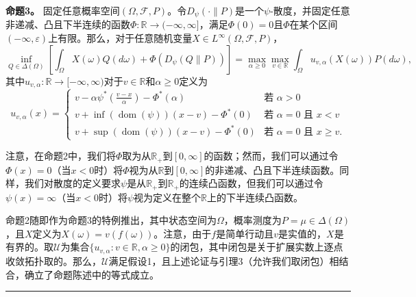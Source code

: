 \documentclass[12pt,a4paper]{article}
\newenvironment{translation}
  {\par\noindent\color{blue!70!black}\smallskip}
  {\par\medskip\hrule\medskip}
\begin{document}
\begin{translation}
\textbf{命题3。} 固定任意概率空间$(\Omega, \mathcal{F}, P)$。令$D_\psi(\cdot\|P)$是一个$\psi$-散度，并固定任意非递减、凸且下半连续的函数$\Phi: \mathbb{R} \to (-\infty, \infty]$，满足$\Phi(0) = 0$且$\Phi$在某个区间$(-\infty, \varepsilon)$上有限。那么，对于任意随机变量$X \in L^\infty(\Omega, \mathcal{F}, P)$，
\[
\inf_{Q \in \Delta(\Omega)} \left[ \int_\Omega X(\omega) Q(d\omega) + \Phi(D_\psi(Q\|P)) \right] = \max_{\alpha \geq 0} \max_{v \in \mathbb{R}} \int_\Omega u_{v,\alpha}(X(\omega)) P(d\omega),
\]
其中$u_{v,\alpha}: \mathbb{R} \to [-\infty, \infty)$对于$v \in \mathbb{R}$和$\alpha \geq 0$定义为
\[
u_{v,\alpha}(x) = \begin{cases}
v - \alpha \psi^*\left( \frac{v - x}{\alpha} \right) - \Phi^*(\alpha) & \text{若 } \alpha > 0 \\
v + \inf(\operatorname{dom}(\psi)) (x - v) - \Phi^*(0) & \text{若 } \alpha = 0 \text{ 且 } x < v \\
v + \sup(\operatorname{dom}(\psi)) (x - v) - \Phi^*(0) & \text{若 } \alpha = 0 \text{ 且 } x \geq v.
\end{cases}
\]

注意，在命题2中，我们将$\Phi$取为从$\mathbb{R}_+$到$[0, \infty]$的函数；然而，我们可以通过令$\Phi(x) = 0$（当$x < 0$时）将$\Phi$视为从$\mathbb{R}$到$[0, \infty]$的非递减、凸且下半连续函数。同样，我们对散度的定义要求$\psi$是从$\mathbb{R}_+$到$\mathbb{R}_+$的连续凸函数，但我们可以通过令$\psi(x) = \infty$（当$x < 0$时）将$\psi$视为定义在整个$\mathbb{R}$上的下半连续凸函数。

命题2随即作为命题3的特例推出，其中状态空间为$\Omega$，概率测度为$P = \mu \in \Delta(\Omega)$，且$X$定义为$X(\omega) = v(f(\omega))$。注意，由于$f$是简单行动且$v$是实值的，$X$是有界的。取$\mathcal{U}$为集合$\{ u_{v,\alpha} : v \in \mathbb{R}, \alpha \geq 0 \}$的闭包，其中闭包是关于扩展实数上逐点收敛拓扑取的。那么，$\mathcal{U}$满足假设1，且上述论证与引理3（允许我们取闭包）相结合，确立了命题陈述中的等式成立。
\end{translation}
\end{document}
